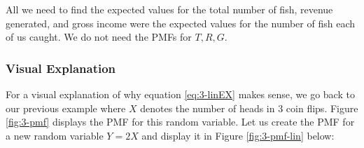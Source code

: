 \documentclass[
]{book}
\begin{document}
All we need to find the expected values for the total number of fish, revenue generated, and gross income were the expected values for the number of fish each of us caught. We do not need the PMFs for \(T,R,G\).

\subsubsection{Visual Explanation}\label{visual-explanation}

For a visual explanation of why equation \eqref{eq:3-linEX} makes sense, we go back to our previous example where \(X\) denotes the number of heads in 3 coin flips. Figure \ref{fig:3-pmf} displays the PMF for this random variable. Let us create the PMF for a new random variable \(Y=2X\) and display it in Figure \ref{fig:3-pmf-lin} below:
\end{document}
